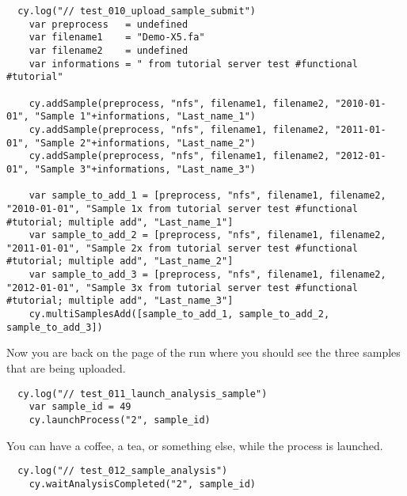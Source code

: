 \begin{verbatim}
  cy.log("// test_010_upload_sample_submit")
    var preprocess   = undefined
    var filename1    = "Demo-X5.fa"
    var filename2    = undefined
    var informations = " from tutorial server test #functional #tutorial"

    cy.addSample(preprocess, "nfs", filename1, filename2, "2010-01-01", "Sample 1"+informations, "Last_name_1")
    cy.addSample(preprocess, "nfs", filename1, filename2, "2011-01-01", "Sample 2"+informations, "Last_name_2")
    cy.addSample(preprocess, "nfs", filename1, filename2, "2012-01-01", "Sample 3"+informations, "Last_name_3")

    var sample_to_add_1 = [preprocess, "nfs", filename1, filename2, "2010-01-01", "Sample 1x from tutorial server test #functional #tutorial; multiple add", "Last_name_1"]
    var sample_to_add_2 = [preprocess, "nfs", filename1, filename2, "2011-01-01", "Sample 2x from tutorial server test #functional #tutorial; multiple add", "Last_name_2"]
    var sample_to_add_3 = [preprocess, "nfs", filename1, filename2, "2012-01-01", "Sample 3x from tutorial server test #functional #tutorial; multiple add", "Last_name_3"]
    cy.multiSamplesAdd([sample_to_add_1, sample_to_add_2, sample_to_add_3])

\end{verbatim}

Now you are back on the page of the run where you should see the three samples
that are being uploaded.

\begin{verbatim}
  cy.log("// test_011_launch_analysis_sample")
    var sample_id = 49
    cy.launchProcess("2", sample_id)

\end{verbatim}

You can have a coffee, a tea, or something else, while the process is
launched.

\begin{verbatim}
  cy.log("// test_012_sample_analysis")
    cy.waitAnalysisCompleted("2", sample_id)

\end{verbatim}

